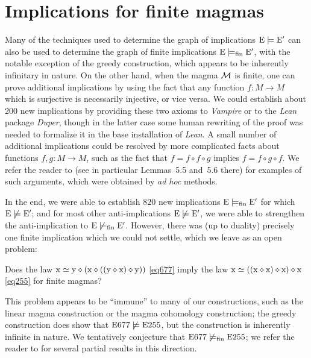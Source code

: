 \section{Implications for finite magmas}\label{austin-sec}

Many of the techniques used to determine the graph of implications $\mathrm{E} \models \mathrm{E}'$ can also be used to determine the graph of finite implications $\mathrm{E} \models_{\mathrm{fin}} \mathrm{E}'$, with the notable exception of the greedy construction, which appears to be inherently infinitary in nature.  On the other hand, when the magma ${\mathcal{M}}$ is finite, one can prove additional implications by using the fact that any function $f \colon M \to M$ which is surjective is necessarily injective, or vice versa.  We could establish about 200 new implications by providing these two axioms to \emph{Vampire} or to the \emph{Lean} package \emph{Duper}, though in the latter case some human rewriting of the proof was needed to formalize it in the base installation of \emph{Lean}.  A small number of additional implications could be resolved by more complicated facts about functions $f,g \colon M \to M$, such as the fact that $f = f \circ f \circ g$ implies $f = f \circ g \circ f$.  We refer the reader to \cite[Section~5.2]{ETP_blueprint} (see in particular Lemmas~5.5 and~5.6 there) for examples of such arguments, which were obtained by \emph{ad hoc} methods.

In the end, we were able to establish $820$ new implications $\mathrm{E} \models_{\mathrm{fin}} \mathrm{E}'$ for which $\mathrm{E} \not \models \mathrm{E}'$; and for most other anti-implications $\mathrm{E} \not \models \mathrm{E}'$, we were able to strengthen the anti-implication to $\mathrm{E} \not \models_{\mathrm{fin}} \mathrm{E}'$.  However, there was (up to duality) precisely one finite implication which we could not settle, which we leave as an open problem:

\begin{problem}  Does the law $\mathrm{x} \simeq \mathrm{y} \diamond (\mathrm{x} \diamond ((\mathrm{y} \diamond \mathrm{x}) \diamond \mathrm{y}))$ \eqref{eq677} imply the law $\mathrm{x} \simeq ((\mathrm{x} \diamond \mathrm{x}) \diamond \mathrm{x}) \diamond \mathrm{x}$ \eqref{eq255} for finite magmas?
\end{problem}

This problem appears to be ``immune'' to many of our constructions, such as the linear magma construction or the magma cohomology construction; the greedy construction does show that $\mathrm{E}677 \not \models \mathrm{E}255$, but the construction is inherently infinite in nature.  We tentatively conjecture that $\mathrm{E}677 \not \models_{\mathrm{fin}} \mathrm{E}255$; we refer the reader to \cite[Chapter~13]{ETP_blueprint} for several partial results in this direction.
